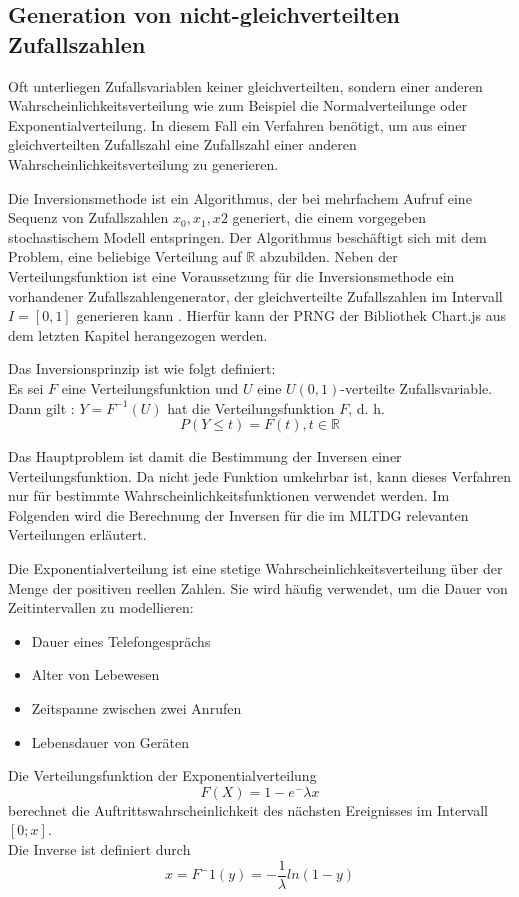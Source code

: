 \subsection{Generation von nicht-gleichverteilten Zufallszahlen}

Oft unterliegen Zufallsvariablen keiner gleichverteilten, sondern einer anderen Wahrscheinlichkeitsverteilung wie zum Beispiel die Normalverteilunge oder Exponentialverteilung. In diesem Fall ein Verfahren benötigt, um aus einer gleichverteilten Zufallszahl eine Zufallszahl einer anderen Wahrscheinlichkeitsverteilung zu generieren.

Die Inversionsmethode ist ein Algorithmus, der bei mehrfachem Aufruf eine Sequenz von Zufallszahlen $x_0, x_1, x2$ generiert, die einem vorgegeben stochastischem Modell entspringen. Der Algorithmus beschäftigt sich mit dem Problem, eine beliebige Verteilung auf $\mathbb{R}$ abzubilden. Neben der Verteilungsfunktion ist eine Voraussetzung für die Inversionsmethode ein vorhandener Zufallszahlengenerator, der gleichverteilte Zufallszahlen im Intervall $I=[0,1]$ generieren kann \cite{Inversionsmethode}. Hierfür kann der \ac{PRNG} der Bibliothek Chart.js aus dem letzten Kapitel herangezogen werden.

Das Inversionsprinzip ist wie folgt definiert:\\
Es sei $F$ eine Verteilungsfunktion und $U$ eine $U(0,1)$-verteilte Zufallsvariable.\\
Dann gilt \cite{Inversionsmethode}: $Y = F^{-1}(U)$ hat die Verteilungsfunktion $F$, d. h.
$$P(Y \le t)=F(t),t \in \mathbb{R}$$

Das Hauptproblem ist damit die Bestimmung der Inversen einer Verteilungsfunktion. Da nicht jede Funktion umkehrbar ist, kann dieses Verfahren nur für bestimmte Wahrscheinlichkeitsfunktionen verwendet werden. Im Folgenden wird die Berechnung der Inversen für die im \ac{MLTDG} relevanten Verteilungen erläutert.

Die Exponentialverteilung ist eine stetige Wahrscheinlichkeitsverteilung über der Menge der positiven reellen Zahlen. Sie wird häufig verwendet, um die Dauer von Zeitintervallen zu modellieren:
\begin{itemize}
    \item Dauer eines Telefongesprächs
    \item Alter von Lebewesen
    \item Zeitspanne zwischen zwei Anrufen
    \item Lebensdauer von Geräten
\end{itemize}
Die Verteilungsfunktion der Exponentialverteilung 
$$F(X)=1-e^-\lambda x$$
berechnet die Auftrittswahrscheinlichkeit des nächsten Ereignisses im Intervall $[0;x]$.\\
Die Inverse ist definiert durch
$$x=F^-1(y)=-\frac{1}{\lambda}ln(1-y)$$

